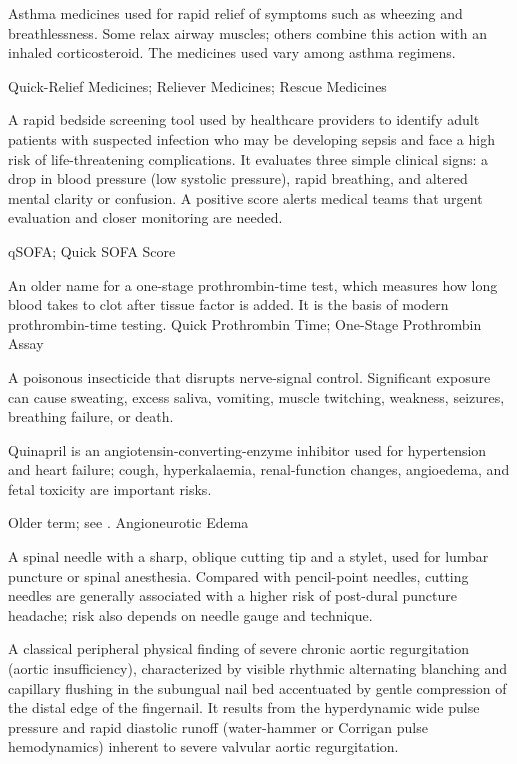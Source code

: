  Asthma medicines used for rapid relief of symptoms such as wheezing and breathlessness. Some relax airway muscles; others combine this action with an inhaled corticosteroid. The medicines used vary among asthma regimens.

\synonyms
Quick-Relief Medicines; Reliever Medicines; Rescue Medicines

 A rapid bedside screening tool used by healthcare providers to identify adult patients with suspected infection who may be developing sepsis and face a high risk of life-threatening complications. It evaluates three simple clinical signs: a drop in blood pressure (low systolic pressure), rapid breathing, and altered mental clarity or confusion. A positive score alerts medical teams that urgent evaluation and closer monitoring are needed.

\synonyms
qSOFA; Quick SOFA Score

 An older name for a one-stage prothrombin-time test, which measures how long blood takes to clot after tissue factor is added. It is the basis of modern prothrombin-time testing.
\synonyms
Quick Prothrombin Time; One-Stage Prothrombin Assay

 A poisonous insecticide that disrupts nerve-signal control. Significant exposure can cause sweating, excess saliva, vomiting, muscle twitching, weakness, seizures, breathing failure, or death.

 Quinapril is an angiotensin-converting-enzyme inhibitor used for hypertension and heart failure; cough, hyperkalaemia, renal-function changes, angioedema, and fetal toxicity are important risks.

 Older term; see .
\synonyms
Angioneurotic Edema

 A spinal needle with a sharp, oblique cutting tip and a stylet, used for lumbar puncture or spinal anesthesia. Compared with pencil-point needles, cutting needles are generally associated with a higher risk of post-dural puncture headache; risk also depends on needle gauge and technique.

 A classical peripheral physical finding of severe chronic aortic regurgitation (aortic insufficiency), characterized by visible rhythmic alternating blanching and capillary flushing in the subungual nail bed accentuated by gentle compression of the distal edge of the fingernail. It results from the hyperdynamic wide pulse pressure and rapid diastolic runoff (water-hammer or Corrigan pulse hemodynamics) inherent to severe valvular aortic regurgitation.

